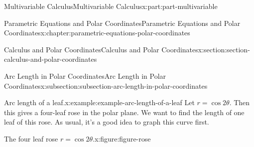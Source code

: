 \documentclass[twoside,10pt,]{tufte-book}
\numberwithin{equation}{part}
\begin{document}
\begin{partptx}{Multivariable Calculus}{}{Multivariable Calculus}{}{}{x:part:part-multivariable}
\begin{chapterptx}{Parametric Equations and Polar Coordinates}{}{Parametric Equations and Polar Coordinates}{}{}{x:chapter:parametric-equations-polar-coordinates}
\begin{sectionptx}{Calculus and Polar Coordinates}{}{Calculus and Polar Coordinates}{}{}{x:section:section-calculus-and-polar-coordinates}
\begin{subsectionptx}{Arc Length in Polar Coordinates}{}{Arc Length in Polar Coordinates}{}{}{x:subsection:subsection-arc-length-in-polar-coordinates}
\begin{example}{Arc length of a leaf.}{x:example:example-arc-length-of-a-leaf}
Let \(r = \cos2\theta\). Then this gives a four-leaf rose in the polar plane. We want to find the length of one leaf of this rose. As usual, it's a good idea to graph this curve first.%
\begin{figureptx}{The four leaf rose \(r=\cos2\theta\).}{x:figure:figure-rose}{}%
\begin{image}{0}{1}{0}%
\end{image}
\end{figureptx}
\end{example}
\end{subsectionptx}
\end{sectionptx}
\end{chapterptx}
\end{partptx}
\end{document}
